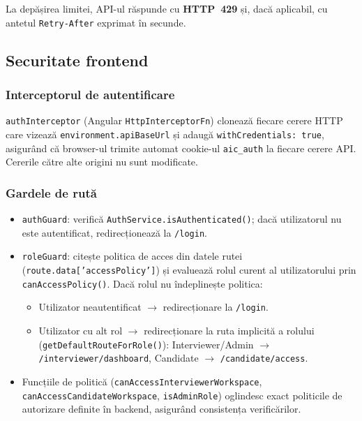 La depășirea limitei, API-ul răspunde cu \textbf{HTTP~429} și, dacă
aplicabil, cu antetul \texttt{Retry-After} exprimat în secunde.

\subsection{Securitate frontend}

\subsubsection{Interceptorul de autentificare}

\texttt{authInterceptor} (Angular \texttt{HttpInterceptorFn}) clonează
fiecare cerere HTTP care vizează \texttt{environment.apiBaseUrl} și
adaugă \texttt{withCredentials: true}, asigurând că browser-ul trimite
automat cookie-ul \texttt{aic\_auth} la fiecare cerere API.
Cererile către alte origini nu sunt modificate.

\subsubsection{Gardele de rută}

\begin{itemize}
  \item \texttt{authGuard}: verifică \texttt{AuthService.isAuthenticated()};
        dacă utilizatorul nu este autentificat, redirecționează la
        \texttt{/login}.

  \item \texttt{roleGuard}: citește politica de acces din datele rutei
        (\texttt{route.data['accessPolicy']}) și evaluează rolul curent
        al utilizatorului prin \texttt{canAccessPolicy()}.
        Dacă rolul nu îndeplinește politica:
        \begin{itemize}
          \item Utilizator neautentificat $\rightarrow$ redirecționare la \texttt{/login}.
          \item Utilizator cu alt rol $\rightarrow$ redirecționare la ruta implicită
                a rolului (\texttt{getDefaultRouteForRole()}):
                Interviewer/Admin $\rightarrow$ \texttt{/interviewer/dashboard},
                Candidate $\rightarrow$ \texttt{/candidate/access}.
        \end{itemize}

  \item Funcțiile de politică (\texttt{canAccessInterviewerWorkspace},
        \texttt{canAccessCandidateWorkspace}, \texttt{isAdminRole}) oglindesc
        exact politicile de autorizare definite în backend, asigurând
        consistența verificărilor.
\end{itemize}


